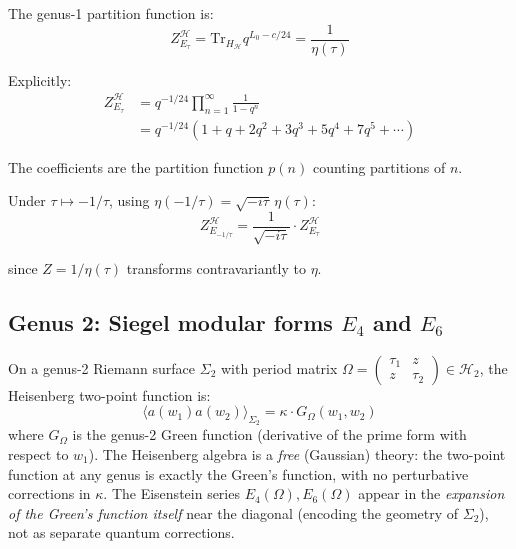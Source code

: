\begin{computation}\label{comp:heisenberg-partition-g1}
The genus-1 partition function is:
\begin{equation}
Z_{E_\tau}^{\mathcal{H}} = \text{Tr}_{H_{\mathcal{H}}} q^{L_0 - c/24} 
= \frac{1}{\eta(\tau)}
\end{equation}

Explicitly:
\begin{align}
Z_{E_\tau}^{\mathcal{H}} &= q^{-1/24} \prod_{n=1}^{\infty} \frac{1}{1 - q^n} \\
&= q^{-1/24}(1 + q + 2q^2 + 3q^3 + 5q^4 + 7q^5 + \cdots)
\end{align}

The coefficients are the partition function $p(n)$ counting partitions of $n$.

Under $\tau \mapsto -1/\tau$, using $\eta(-1/\tau) = \sqrt{-i\tau}\,\eta(\tau)$:
\[Z_{E_{-1/\tau}}^{\mathcal{H}} = \frac{1}{\sqrt{-i\tau}} \cdot Z_{E_\tau}^{\mathcal{H}}\]

since $Z = 1/\eta(\tau)$ transforms contravariantly to $\eta$.
\end{computation}

\subsection{\texorpdfstring{Genus 2: Siegel modular forms $E_4$ and $E_6$}{Genus 2: Siegel modular forms E 4 and E 6}}
\label{subsec:heisenberg-genus-two}

\begin{theorem}\label{thm:heisenberg-genus-two}
On a genus-2 Riemann surface $\Sigma_2$ with period matrix 
$\Omega = \begin{pmatrix} \tau_1 & z \\ z & \tau_2 \end{pmatrix} \in \mathcal{H}_2$, 
the Heisenberg two-point function is:
\begin{equation}
\langle a(w_1) a(w_2) \rangle_{\Sigma_2} = \kappa \cdot G_{\Omega}(w_1, w_2)
\end{equation}
where $G_{\Omega}$ is the genus-2 Green function (derivative of the prime form with respect to $w_1$). The Heisenberg algebra is a \emph{free} (Gaussian) theory: the two-point function at any genus is exactly the Green's function, with no perturbative corrections in $\kappa$. The Eisenstein series $E_4(\Omega), E_6(\Omega)$ appear in the \emph{expansion of the Green's function itself} near the diagonal (encoding the geometry of $\Sigma_2$), not as separate quantum corrections.
\end{theorem}

